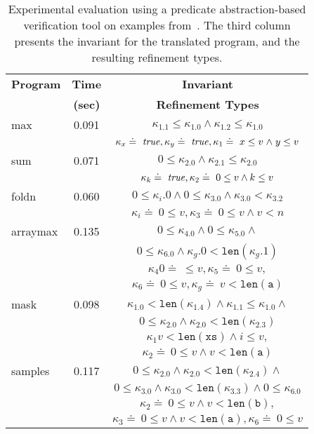 \documentclass[nocopyrightspace]{sigplanconf}
\newcommand{\defeq}{\doteq\ }
\def\true{{\it true}}
\newcommand{\kvar}{\kappa}
\def\rkvar{{\kvar}}
\begin{document}
\fi
\begin{table}[t]
\begin{small}
  \centering
  \begin{tabular}{|l||c|c|}
\hline
    \textbf{Program} & \textbf{Time} & \textbf{Invariant} \\ \cline{3-3}
    & \textbf{(sec)}& \textbf{Refinement Types} \\ \hline\hline
max & 0.091 & $\rkvar_1.1\leq\rkvar_1.0 \wedge
      \rkvar_1.2\leq\rkvar_1.0$ \\ \cline{3-3}
    & & $\rkvar_x \defeq \true, \rkvar_y \defeq \true,  \rkvar_1
    \defeq x \leq v \mathrel{\wedge} y \leq v$ \\ \hline
sum & 0.071 & 
    $0 \leq \rkvar_2.0 \wedge \rkvar_2.1 \leq \rkvar_2.0 $ \\\cline{3-3}
    & & $\rkvar_k \defeq \true, \rkvar_2 \defeq 0 \leq v \wedge k \leq
    v$ \\ \hline
foldn & 0.060 & 
    $0 \leq \rkvar_i.0 \wedge 0 \leq \rkvar_3.0 \wedge \rkvar_3.0 <
    \rkvar_3.2$ \\ \cline{3-3} 
    &&  $\rkvar_i \defeq 0 \leq v, \rkvar_3 \defeq 0 \leq v \wedge v <
    n$ \\ \hline
arraymax & 0.135 & 
    $ 0\leq \rkvar_4.0 \wedge 0\leq \rkvar_5.0 \mathrel{\wedge} $\\
    & & $0\leq \rkvar_6.0 \wedge \rkvar_g.0 <
    \mathtt{len}(\rkvar_g.1)$ \\ \cline{3-3}
    & & $\rkvar_4 0 \defeq \leq v, \rkvar_5 \defeq 0 \leq v,$\\
    & & $\rkvar_6 \defeq 0 \leq v, \rkvar_g \defeq v < \mathtt{len(a)}$ \\\hline
mask & 0.098 &
    $\rkvar_1.0 < \mathtt{len}(\rkvar_1.4) \wedge \rkvar_1.1 \leq \rkvar_1.0 \mathrel{\wedge}$ \\
    & & $0 \leq \rkvar_2.0 \wedge \rkvar_2.0 < \mathtt{len}(\rkvar_2.3)$\\\cline{3-3}
    & & $\rkvar_1 v < \mathtt{len(xs)} \wedge i \leq v,$\\
    & & $\rkvar_2 \defeq 0 \leq v \wedge v < \mathtt{len(a)}$ \\\hline
samples & 0.117 &
    $ 0 \leq \rkvar_2.0 \wedge \rkvar_2.0 < \mathtt{len}(\rkvar_2.4) \mathrel{\wedge}$\\
    & & $0 \leq \rkvar_3.0 \wedge \rkvar_3.0 <
    \mathtt{len}(\rkvar_3.3) \mathrel{\wedge} 0 \leq \rkvar_6.0$ \\\cline{3-3}
    & & $\rkvar_2 \defeq 0 \leq v \wedge v < \mathtt{len(b)}, $ \\
    & & $\rkvar_3 \defeq 0 \leq v \wedge v < \mathtt{len(a)}, \rkvar_6 \defeq 0 \leq v$\\\hline
\end{tabular}
  \caption{Experimental evaluation using a predicate abstraction-based
    verification tool on examples from~\cite{LiquidPLDI08}.
    The third column presents the invariant for the translated
program, and the resulting refinement types.}
  \label{tab:experiments}
\end{small}
\end{table}
\end{document}
